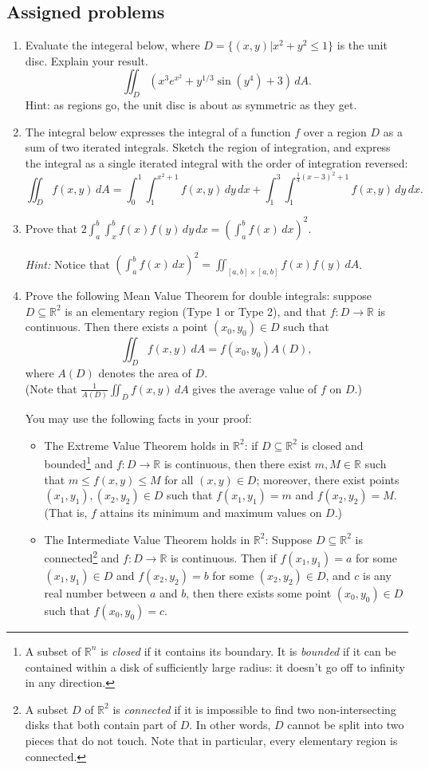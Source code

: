 \documentclass[letterpaper,12pt]{article}
\newcommand{\R}{\mathbb{R}}
\begin{document}
\subsection*{Assigned problems}
\begin{enumerate}
 \item Evaluate the integeral below, where $D=\{(x,y) | x^2+y^2\leq 1\}$ is the unit disc. Explain your result.
\[
 \iint_D (x^3e^{x^2}+y^{1/3}\sin(y^4)+3)\,dA.
\]
Hint: as regions go, the unit disc is about as symmetric as they get.

 \item The integral below expresses the integral of a function $f$ over a region $D$ as a sum of two iterated integrals. Sketch the region of integration, and express the integral as a single iterated integral with the order of integration reversed:
\[
 \iint_D f(x,y)\,dA = \int_0^1\int_1^{x^2+1}f(x,y)\,dy\,dx + \int_1^3\int_1^{\frac{1}{4}(x-3)^2+1}f(x,y)\,dy\,dx.
\]
 \item Prove that $\displaystyle 2\int_a^b\int_x^b f(x)f(y)\,dy\,dx = \left(\int_a^b f(x)\,dx\right)^2$.

{\em Hint:} Notice that $\left(\int_a^b f(x)\,dx\right)^2 = \iint_{[a,b]\times [a,b]}f(x)f(y)\,dA$.

 \item Prove the following Mean Value Theorem for double integrals: suppose $D\subseteq \R^2$ is an elementary region (Type 1 or Type 2), and that $f:D\to \R$ is continuous. Then there exists a point $(x_0,y_0)\in D$ such that 
\[
 \iint_Df(x,y)\,dA = f(x_0,y_0)A(D),
\]
where $A(D)$ denotes the area of $D$. \\
(Note that $\frac{1}{A(D)}\iint_D f(x,y)\,dA$ gives the average value of $f$ on $D$.)

You may use the following facts in your proof:
\begin{itemize}
 \item The Extreme Value Theorem holds in $\R^2$: if $D\subseteq \R^2$ is closed and bounded\footnote{A subset of $\R^n$ is {\em closed} if it contains its boundary. It is {\em bounded} if it can be contained within a disk of sufficiently large radius: it doesn't go off to infinity in any direction.} and $f:D\to\R$ is continuous, then there exist $m,M\in\R$ such that $m\leq f(x,y)\leq M$ for all $(x,y)\in D$; moreover, there exist points $(x_1,y_1), (x_2,y_2)\in D$ such that $f(x_1,y_1)=m$ and $f(x_2,y_2)=M$. (That is, $f$ attains its minimum and maximum values on $D$.)

 \item The Intermediate Value Theorem holds in $\R^2$: Suppose $D\subseteq \R^2$ is connected\footnote{A subset $D$ of $\R^2$ is {\em connected} if it is impossible to find two non-intersecting disks that both contain part of $D$. In other words, $D$ cannot be split into two pieces that do not touch. Note that in particular, every elementary region is connected.} and $f:D\to \R$ is continuous. Then if $f(x_1,y_1)=a$ for some $(x_1,y_1)\in D$ and $f(x_2,y_2)=b$ for some $(x_2,y_2)\in D$, and $c$ is any real number between $a$ and $b$, then there exists some point $(x_0,y_0)\in D$ such that $f(x_0,y_0)=c$.
\end{itemize}

\end{enumerate}
\end{document}
